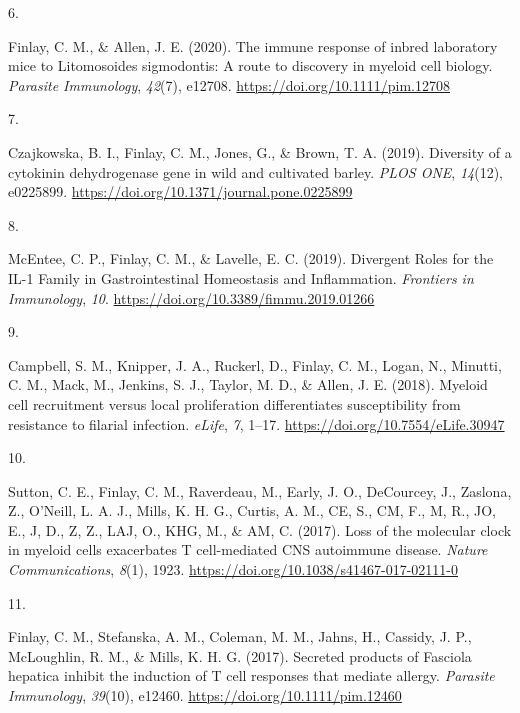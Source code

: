 \documentclass[8pt,a4paper,]{awesome-cv}
\newlength{\csllabelwidth}
\newcommand{\CSLLeftMargin}[1]{\parbox[t]{\csllabelwidth}{#1}}
\newcommand{\CSLRightInline}[1]{\parbox[t]{\linewidth - \csllabelwidth}{#1}}
\begin{document}
\leavevmode{}%
\CSLLeftMargin{6. }%
\CSLRightInline{Finlay, C. M., \& Allen, J. E. (2020). The immune
response of inbred laboratory mice to Litomosoides sigmodontis: A route
to discovery in myeloid cell biology. \emph{Parasite Immunology},
\emph{42}(7), e12708. \url{https://doi.org/10.1111/pim.12708}}

\leavevmode{}%
\CSLLeftMargin{7. }%
\CSLRightInline{Czajkowska, B. I., Finlay, C. M., Jones, G., \& Brown,
T. A. (2019). Diversity of a cytokinin dehydrogenase gene in wild and
cultivated barley. \emph{PLOS ONE}, \emph{14}(12), e0225899.
\url{https://doi.org/10.1371/journal.pone.0225899}}

\leavevmode{}%
\CSLLeftMargin{8. }%
\CSLRightInline{McEntee, C. P., Finlay, C. M., \& Lavelle, E. C. (2019).
Divergent Roles for the IL-1 Family in Gastrointestinal Homeostasis and
Inflammation. \emph{Frontiers in Immunology}, \emph{10}.
\url{https://doi.org/10.3389/fimmu.2019.01266}}

\leavevmode{}%
\CSLLeftMargin{9. }%
\CSLRightInline{Campbell, S. M., Knipper, J. A., Ruckerl, D., Finlay, C.
M., Logan, N., Minutti, C. M., Mack, M., Jenkins, S. J., Taylor, M. D.,
\& Allen, J. E. (2018). Myeloid cell recruitment versus local
proliferation differentiates susceptibility from resistance to filarial
infection. \emph{eLife}, \emph{7}, 1--17.
\url{https://doi.org/10.7554/eLife.30947}}

\leavevmode{}%
\CSLLeftMargin{10. }%
\CSLRightInline{Sutton, C. E., Finlay, C. M., Raverdeau, M., Early, J.
O., DeCourcey, J., Zaslona, Z., O'Neill, L. A. J., Mills, K. H. G.,
Curtis, A. M., CE, S., CM, F., M, R., JO, E., J, D., Z, Z., LAJ, O.,
KHG, M., \& AM, C. (2017). Loss of the molecular clock in myeloid cells
exacerbates T cell-mediated CNS autoimmune disease. \emph{Nature
Communications}, \emph{8}(1), 1923.
\url{https://doi.org/10.1038/s41467-017-02111-0}}

\leavevmode{}%
\CSLLeftMargin{11. }%
\CSLRightInline{Finlay, C. M., Stefanska, A. M., Coleman, M. M., Jahns,
H., Cassidy, J. P., McLoughlin, R. M., \& Mills, K. H. G. (2017).
Secreted products of Fasciola hepatica inhibit the induction of T cell
responses that mediate allergy. \emph{Parasite Immunology},
\emph{39}(10), e12460. \url{https://doi.org/10.1111/pim.12460}}
\end{document}
